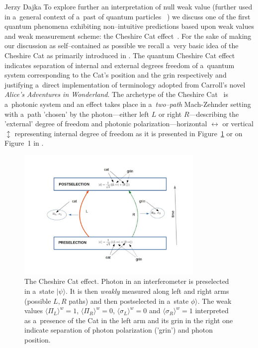 \begin{artengenv}{Jerzy Dajka}
To explore further an interpretation of null weak value (further used in a~general context of a~past of quantum particles ~\parencite{PhysRevA.95.032110,PhysRevA.97.046102,PhysRevA.97.046103}) we discuss one of the first quantum phenomena exhibiting non--intuitive predictions based upon weak values and weak measurement scheme: the Cheshire Cat effect~\parencite{cat,cat_schlos}. For the sake of making our discussion as self--contained as possible we recall a~very basic idea of the  Cheshire Cat as primarily introduced in \parencite{cat}.   The quantum Cheshire Cat effect~\parencite{cat} indicates  separation of internal and external degrees freedom of a~quantum system corresponding to the Cat's position and the grin respectively and justifying a~direct implementation of terminology adopted from Carroll's novel {\it Alice’s Adventures in Wonderland}. 
%
The archetype of the Cheshire Cat~\parencite{cat} is a~photonic system and an effect takes place in a~{\it two--path} Mach-Zehnder setting with a~path 'chosen' by  the photon---either left $L$ or right $R$---describing the 'external' degree of freedom  and photonic polarization---horizontal $\leftrightarrow$ or vertical $\updownarrow$ representing internal degree of freedom as it is presented in Figure~\ref{cat} or on Figure~1 in \parencite{cat}. 
\begin{figure}
 \begin{center}
 \includegraphics[width=0.8\textwidth]{ART_dajka/cat.jpg}%
 \end{center}%
 \caption{The Cheshire Cat effect. Photon in an interferometer is preselected in a~state $|\psi\rangle$.  It is then  {\it weakly} measured along left and right arms (possible $L,R$ paths)  and then postselected in a~state $\phi\rangle$. The weak values $
\langle \Pi_L\rangle^w =1$,
$\langle \Pi_R\rangle^w=0$, 
$\langle \sigma_L\rangle^w =0$ and $\langle \sigma_R\rangle^w=1$ interpreted as a~presence of the Cat in the left arm and its grin in the right one indicate separation of photon polarization ('grin') and photon position. }\label{cat}

\end{figure}
\end{artengenv}
